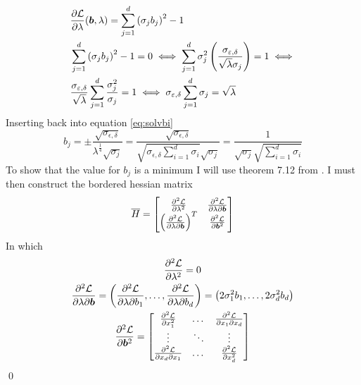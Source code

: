 \documentclass[a4paper,12pt]{article}
\renewenvironment{proof}{{\textit{Proof} \\}}{\qed}
\begin{document}
\begin{proof}
\begin{align}
    &\frac{\partial \mathcal{L}}{\partial \lambda}(\bm{b},\lambda) = 
    \sum_{j=1}^d \left ( \sigma_j b_j\right)^2 - 1 \\
    &\sum_{j=1}^d \left ( \sigma_j b_j\right)^2 - 1 = 0 \iff
    \sum_{j=1}^d \sigma_j^2 \left ( \frac{\sigma_{\varepsilon,\delta}}{\sqrt{\lambda}\sigma_j}\right) = 1 \iff \\
    \label{eq:optlam}
    &\frac{\sigma_{\varepsilon,\delta}}{\sqrt{\lambda}} \sum_{j=1}^d \frac{\sigma_j^2}{\sigma_j} = 1 \iff
    \sigma_{\varepsilon,\delta} \sum_{j=1}^d \sigma_j = \sqrt{\lambda}
\end{align}
Inserting back into equation \eqref{eq:solvbi}
\begin{equation}
\label{eq:optbj}
    b_j = \pm \frac{\sqrt{\sigma_{\epsilon,\delta}}}{\lambda^{\frac{1}{4}} \sqrt{\sigma_j}} =
    \frac{\sqrt{\sigma_{\epsilon,\delta}}}{\sqrt{\sigma_{\epsilon,\delta} \sum_{i=1}^d \sigma_i} \sqrt{\sigma_j}} = 
    \frac{1}{\sqrt{\sigma_j} \sqrt{\sum_{i=1}^d \sigma_i} } 
\end{equation}
To show that the value for $b_j$ is a minimum I will use theorem 7.12 from \cite{matrixcalc}.
I must then construct the bordered hessian matrix
\[
    \overline{H} =
    \begin{bmatrix}
       \frac{\partial^2 \mathcal{L}}{\partial \lambda^2} & \frac{\partial^2 \mathcal{L}}{\partial \lambda \partial \bm{b}} \\
       \left (\frac{\partial^2 \mathcal{L}}{\partial \lambda \partial \bm{b}}\right)^T & \frac{\partial^2 \mathcal{L}}{\partial \bm{b}^2}
    \end{bmatrix}
\]
In which 
\begin{gather*}
\frac{\partial^2 \mathcal{L}}{\partial \lambda^2}  = 0 \\
\frac{\partial^2 \mathcal{L}}{\partial \lambda \partial \bm{b}}
    = \left (\frac{\partial^2 \mathcal{L}}{\partial \lambda \partial b_1 }, \dots,\frac{\partial^2 \mathcal{L}}{\partial \lambda \partial b_d} \right)
    = \left (2\sigma_1^2 b_1, \dots, 2\sigma_d^2 b_d\right) \\
\frac{\partial^2 \mathcal{L}}{\partial \bm{b}^2} = 
\begin{bmatrix}
    \frac{\partial^2\mathcal{L}}{\partial x_1^2} & \dots & \frac{\partial^2\mathcal{L}}{\partial x_1 \partial x_d} \\
    \vdots  & \ddots & \vdots \\
    \frac{\partial^2\mathcal{L}}{\partial x_d\partial x_1} & \dots & \frac{\partial^2\mathcal{L}}{\partial x_d^2} \\

\end{bmatrix}
\end{gather*}
\end{proof}
\end{document}
